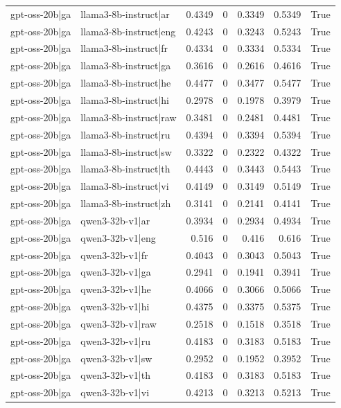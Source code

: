 \begin{table}
\begin{tabular}{l l r r r r l}
gpt-oss-20b|ga & llama3-8b-instruct|ar & 0.4349 & 0 & 0.3349 & 0.5349 & True \\
gpt-oss-20b|ga & llama3-8b-instruct|eng & 0.4243 & 0 & 0.3243 & 0.5243 & True \\
gpt-oss-20b|ga & llama3-8b-instruct|fr & 0.4334 & 0 & 0.3334 & 0.5334 & True \\
gpt-oss-20b|ga & llama3-8b-instruct|ga & 0.3616 & 0 & 0.2616 & 0.4616 & True \\
gpt-oss-20b|ga & llama3-8b-instruct|he & 0.4477 & 0 & 0.3477 & 0.5477 & True \\
gpt-oss-20b|ga & llama3-8b-instruct|hi & 0.2978 & 0 & 0.1978 & 0.3979 & True \\
gpt-oss-20b|ga & llama3-8b-instruct|raw & 0.3481 & 0 & 0.2481 & 0.4481 & True \\
gpt-oss-20b|ga & llama3-8b-instruct|ru & 0.4394 & 0 & 0.3394 & 0.5394 & True \\
gpt-oss-20b|ga & llama3-8b-instruct|sw & 0.3322 & 0 & 0.2322 & 0.4322 & True \\
gpt-oss-20b|ga & llama3-8b-instruct|th & 0.4443 & 0 & 0.3443 & 0.5443 & True \\
gpt-oss-20b|ga & llama3-8b-instruct|vi & 0.4149 & 0 & 0.3149 & 0.5149 & True \\
gpt-oss-20b|ga & llama3-8b-instruct|zh & 0.3141 & 0 & 0.2141 & 0.4141 & True \\
gpt-oss-20b|ga & qwen3-32b-v1|ar & 0.3934 & 0 & 0.2934 & 0.4934 & True \\
gpt-oss-20b|ga & qwen3-32b-v1|eng & 0.516 & 0 & 0.416 & 0.616 & True \\
gpt-oss-20b|ga & qwen3-32b-v1|fr & 0.4043 & 0 & 0.3043 & 0.5043 & True \\
gpt-oss-20b|ga & qwen3-32b-v1|ga & 0.2941 & 0 & 0.1941 & 0.3941 & True \\
gpt-oss-20b|ga & qwen3-32b-v1|he & 0.4066 & 0 & 0.3066 & 0.5066 & True \\
gpt-oss-20b|ga & qwen3-32b-v1|hi & 0.4375 & 0 & 0.3375 & 0.5375 & True \\
gpt-oss-20b|ga & qwen3-32b-v1|raw & 0.2518 & 0 & 0.1518 & 0.3518 & True \\
gpt-oss-20b|ga & qwen3-32b-v1|ru & 0.4183 & 0 & 0.3183 & 0.5183 & True \\
gpt-oss-20b|ga & qwen3-32b-v1|sw & 0.2952 & 0 & 0.1952 & 0.3952 & True \\
gpt-oss-20b|ga & qwen3-32b-v1|th & 0.4183 & 0 & 0.3183 & 0.5183 & True \\
gpt-oss-20b|ga & qwen3-32b-v1|vi & 0.4213 & 0 & 0.3213 & 0.5213 & True \\

\end{tabular}
\end{table}
